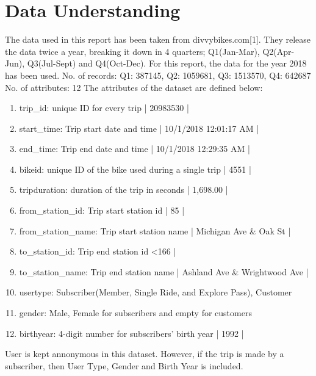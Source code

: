 \documentclass[11pt]{article}
\begin{document}
\section{Data Understanding}
The data used in this report has been taken from divvybikes.com[1]. They release the data twice a year, breaking it down in 4 quarters; Q1(Jan-Mar), Q2(Apr-Jun), Q3(Jul-Sept) and Q4(Oct-Dec). For this report, the data for the year 2018 has been used.
\newline\newline
No. of records: Q1: 387145, Q2: 1059681, Q3: 1513570, Q4: 642687 \newline
No. of attributes: 12
\newline\newline
The attributes of the dataset are defined below:
\begin{enumerate}
   \item trip\_id: unique ID for every trip | 20983530 |
   \item start\_time: Trip start date and time | 10/1/2018  12:01:17 AM |
   \item end\_time: Trip end date and time | 10/1/2018  12:29:35 AM |
   \item bikeid: unique ID of the bike used during a single trip | 4551 |
   \item tripduration: duration of the trip in seconds | 1,698.00 |
   \item from\_station\_id: Trip start station id | 85 |
   \item from\_station\_name: Trip start station name | Michigan Ave \& Oak St |
   \item to\_station\_id: Trip end station id <166 |
   \item to\_station\_name: Trip end station name | Ashland Ave \& Wrightwood Ave |
   \item usertype: Subscriber(Member, Single Ride, and Explore Pass), Customer
   \item gender: Male, Female for subscribers and empty for customers
   \item birthyear: 4-digit number for subscribers' birth year | 1992 |
\end{enumerate}
User is kept annonymous in this dataset. However, if the trip is made by a subscriber, then User Type, Gender and Birth Year is included.
\end{document}
